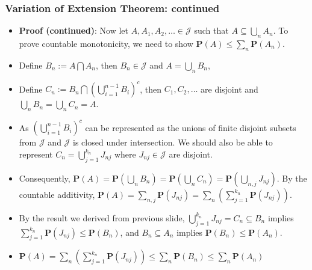 \documentclass[handout]{beamer}
\newcommand{\BP}{\mathbf{P}}
\begin{document}
\frame
{
  \frametitle{Variation of Extension Theorem: continued}

   \begin{itemize}

       
              \item<1-> []\textbf{Proof (continued)}:  Now let $A, A_1,A_2,\ldots \in \mathcal{J}$ such that $A \subseteq \bigcup_n A_n$. To prove countable monotonicity, we need to show $\BP(A)\leq \sum_n \BP(A_n)$.
              
            
            
              
              \item<2->[-]  Define $B_n:=A\bigcap A_n$, then $B_n\in \mathcal{J}$ and $A=\bigcup_n B_n$,
                            
              \item<3->[-] Define $C_n:=B_n\bigcap (\bigcup_{i=1}^{n-1} B_{i})^c$, then $C_1,C_2, \ldots$ are disjoint and $\bigcup_n B_n=\bigcup_n C_n = A$.
 \item<4->[-] As $(\bigcup_{i=1}^{n-1} B_{i})^c$ can be represented as the unions of finite disjoint subsets from $\mathcal{J}$ and $\mathcal{J}$ is closed under intersection. We should also be able to represent $C_n=\bigcup_{j=1}^{k_n} J_{nj}$ where $J_{nj}\in \mathcal{J}$ are disjoint. 
 
 
 \item<5->[-] Consequently, $\BP(A)=\BP(\bigcup_n B_n)=\BP(\bigcup_n C_n)=\BP(\bigcup_{n,j} J_{nj} )$. By the countable additivity, $\BP(A)=\sum_{n,j} \BP(J_{nj} )=\sum_{n} (\sum_{j=1}^{k_n} \BP(J_{nj} ) )$.
 
  \item<6->[-]  By the result we derived from previous slide, $\bigcup_{j=1}^{k_n} J_{nj}=C_n\subseteq B_n$ implies $\sum_{j=1}^{k_n} \BP(J_{nj})\leq \BP(B_n)$, and $B_n\subseteq A_n$ implies $\BP(B_n)\leq \BP(A_n)$.
  
  \item<6->[-]  $\BP(A)=\sum_{n} (\sum_{j=1}^{k_n} \BP(J_{nj} ) ) \leq \sum_n \BP(B_n) \leq \sum_n \BP(A_n) $
 
     
                   \end{itemize}
}
\end{document}
